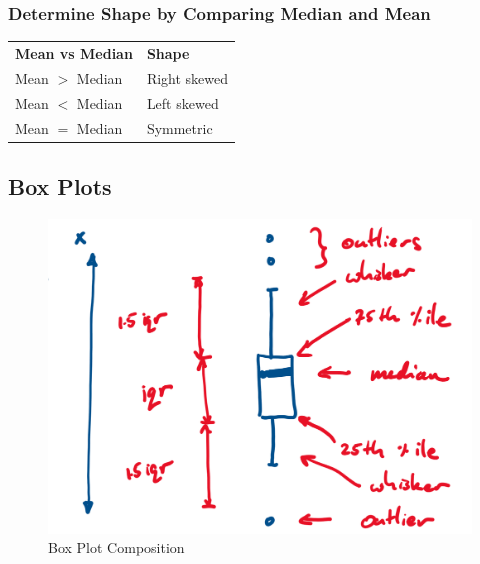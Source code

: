     \subsubsection{Determine Shape by Comparing Median and Mean}
    
      \begin{tabu} to \linewidth{ X[l] | X[l] }
        \thickhline
        \textbf{Mean vs Median} & \textbf{Shape} \\ \thickhline
        Mean $ > $ Median & Right skewed \\ \hline
        Mean $ < $ Median & Left skewed \\ \hline
        Mean $ = $ Median & Symmetric \\ \hline
      \end{tabu}
      
  \subsection{Box Plots}
  
    \begin{figure}[H]
      \centering
      \caption{Box Plot Composition}
      \includegraphics[width=0.7\linewidth]{resources/ch1/box-plot.png}
    \end{figure}